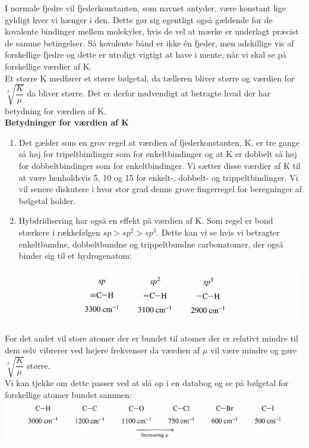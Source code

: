 I normale fjedre vil fjederkonstanten, som navnet antyder, være konstant lige gyldigt hver vi hænger i den. Dette gør sig egentligt også gældende for de kovalente bindinger mellem molekyler, hvis de vel at mærke er underlagt præcist de samme betingelser. Så kovalente bånd er ikke én fjeder, men adskillige vis af forskellige fjedre og dette er utroligt vigtigt at have i mente, når vi skal se på forskellige værdier af K.
\\

Et større K medfører et større bølgetal, da tælleren bliver større og værdien for $\sqrt[2]{\dfrac{K}{\mu}}$ da bliver større. Det er derfor nødvendigt at betragte hvad der har betydning for værdien af K. 
\\
\textbf{Betydninger for værdien af K}
\begin{enumerate}
\item Det gælder som en grov regel at værdien af fjederkonstanten, K, er tre gange så høj for tripeltbindinger som for enkeltbindinger og at K er dobbelt så høj for dobbeltbindinger som for enkeltbindinger. Vi sætter disse værdier af K til at være henholdsvis 5, 10 og 15 for enkelt-, dobbelt- og trippeltbindinger. Vi vil senere diskutere i hvor stor grad denne grove fingerregel for beregninger af bølgetal holder.

\item Hybdridisering har også en effekt på værdien af K. Som regel er bond stærkere i rækkefølgen $sp > sp^2 > sp^3$. Dette kan vi se hvis vi betragter enkeltbundne, dobbeltbundne og trippeltbundne carbonatomer, der også binder sig til et hydrogenatom:

\begin{center}
\includegraphics[scale=1]{Billeder/sp}
\end{center}


\end{enumerate}

For det andet vil store atomer der er bundet til atomer der er relativt mindre til dem selv vibrerer ved højere frekvenser da værdien af $\mu$ vil være mindre og gøre $\sqrt[2]{\dfrac{K}{\mu}}$ større. 
\\

Vi kan tjekke om dette passer ved at slå op i en databog og se på bølgetal for forskellige atomer bundet sammen:
\\
\includegraphics[scale=1]{Billeder/udklip}

